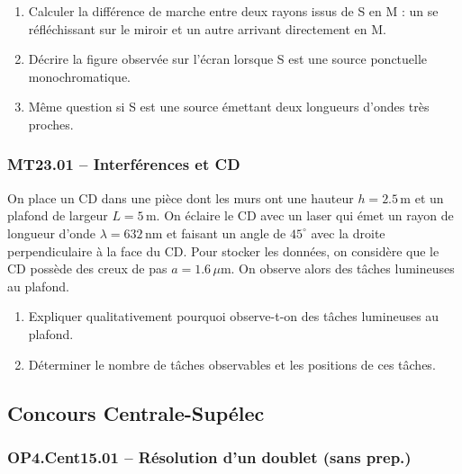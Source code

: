 \begin{center}
\end{center}

\begin{enumerate}
\item Calculer la différence de marche entre deux rayons issus de S en M : un se réfléchissant sur le miroir et un autre arrivant directement en M.
\item Décrire la figure observée sur l'écran lorsque S est une source ponctuelle monochromatique.
\item Même question si S est une source émettant deux longueurs d'ondes très proches.
\end{enumerate}

\subsubsection*{MT23.01 -- Interférences et CD }

\begin{center}
\end{center}

On place un CD dans une pièce dont les murs ont une hauteur $h = 2.5\,\text{m}$ et un plafond de largeur $L = 5\,\text{m}$. On éclaire le CD avec un laser qui émet un rayon de longueur d'onde $\lambda = 632\,\text{nm}$ et faisant un angle de $45^\circ$ avec la droite perpendiculaire à la face du CD. Pour stocker les données, on considère que le CD possède des creux de pas $a = 1.6\,\mu\text{m}$. On observe alors des tâches lumineuses au plafond.

\begin{enumerate}
\item Expliquer qualitativement pourquoi observe-t-on des tâches lumineuses au plafond.
\item Déterminer le nombre de tâches observables et les positions de ces tâches.
\end{enumerate}

\newpage
\subsection*{Concours Centrale-Supélec}

\subsubsection*{OP4.Cent15.01 -- Résolution d'un doublet (sans prep.)  \corrige}

